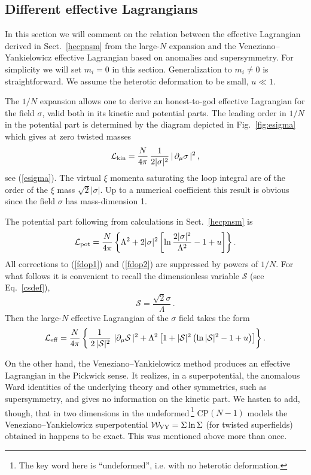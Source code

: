 \documentclass[epsfig,12pt]{article}
\def\beq{\begin{equation}}
\def\eeq{\end{equation}}
\newcommand{\cs}{{\mathcal S}}
\def\beq{\begin{equation}}
\def\eeq{\end{equation}}
\begin{document}
{\subsection{Different effective Lagrangians}
\label{defefl}

In this section we will comment on the relation between the
effective Lagrangian derived in Sect.~\ref{hecpnsm} from the large-$N$ expansion
 and the Veneziano--Yankielowicz
effective Lagrangian based on  anomalies and supersymmetry.
For simplicity we will set $m_i =0$ in this section. 
Generalization to  $m_i \neq 0$ is straightforward. We  assume the heterotic deformation to be small, $u\ll1$.

The $1/N$ expansion allows one to derive an honest-to-god effective
Lagrangian for the field $\sigma$, valid both in its kinetic and potential parts. The  leading order in
$1/N$ in the potential part is determined by the diagram depicted in Fig.~\ref{fig:esigma}
which gives at zero twisted masses
\beq
{\mathcal L}_{\rm kin} =\frac{N}{4\pi}\,\frac{1}{2|\sigma|^2}\,| \,  \partial_\mu\sigma \,|^2
\,,
\label{fdop1}
\eeq
see (\ref{esigma}).
The  virtual $\xi$ momenta saturating the loop integral are of the order of the $\xi$
mass $\sqrt{2}|\sigma|$. Up to a numerical coefficient this result is obvious since the field
$\sigma$ has mass-dimension 1.

The potential part following from calculations in Sect.~\ref{hecpnsm}
is 
\beq
{\mathcal L}_{\rm pot} = \frac{N}{4\pi}\left\{\Lambda^2 +2|\sigma|^2\left[
\ln\frac{2|\sigma|^2}{\Lambda^2}-1+u\right]
\right\}.
\label{fdop2}
\eeq
All corrections to (\ref{fdop1}) and  (\ref{fdop2}) are suppressed by powers
of $1/N$. For what follows it is convenient to recall the dimensionless variable $ \cs $ (see Eq.~\eqref{csdef}),
\beq
\cs = \frac{ \sqrt{2}\sigma}{\Lambda}\,.
\eeq
Then the large-$N$ effective Lagrangian of the $\sigma$ field takes the form
\beq
{\mathcal L}_{\rm eff} =\frac{N}{4\pi}
\left\{
\frac{1}{\,2\, |\cs|^2}\,\,
 | \partial_\mu\cs \, |^2
+\Lambda^2
\left[1 +|\cs |^2\left( \ln |\cs|^2 -1+u\right)\right]
\right\}.
\label{fdop3}
\eeq

On the other hand, 
the Veneziano--Yankielowicz method \cite{VYan} produces 
an effective Lagrangian in the Pickwick sense. It realizes, in a superpotential,  the  anomalous Ward identities of the 
underlying theory
and other symmetries, such as supersymmetry, and gives no information on the kinetic
part. We hasten to add, though, that in two dimensions
in the undeformed\,\footnote{The key word here is ``undeformed'', i.e. with no heterotic deformation.} CP$(N-1)$ models
the Veneziano--Yankielowicz superpotential ${\mathcal W}_{\rm VY} = \Sigma \ln \Sigma $ (for twisted superfields)
 obtained in \cite{AdDVecSal,ChVa,W93} happens to be exact. This was mentioned above more than once.
  
}
\end{document}
